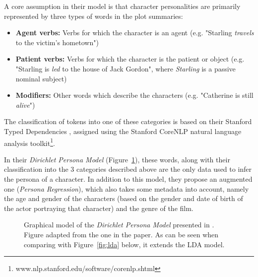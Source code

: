 \documentclass[bsc,frontabs,singlespacing,parskip, twoside]{infthesis}
\begin{document}
A core assumption in their model is that character personalities are primarily represented by three types of words in the plot summaries:
\begin{itemize}
	\item \textbf{Agent verbs:} Verbs for which the character is an agent (e.g. "Starling \textit{travels} to the victim's hometown")
	\item \textbf{Patient verbs:} Verbs for which the character is the patient or object (e.g. "Starling is \textit{led} to the house of Jack Gordon", where \textit{Starling} is a passive nominal subject)
	\item \textbf{Modifiers:} Other words which describe the characters (e.g. "Catherine is still \textit{alive}")
\end{itemize}
The classification of tokens into one of these categories is based on their Stanford Typed Dependencies \cite{de2008stanford}, assigned using the Stanford CoreNLP natural language analysis toolkit\footnote{www.nlp.stanford.edu/software/corenlp.shtml}.

In their \textit{Dirichlet Persona Model} (Figure~\ref{fig:dirichlet_persona}), these words, along with their classification into the 3 categories described above are the only data used to infer the persona of a character. In addition to this model, they propose an augmented one (\textit{Persona Regression}), which also takes some metadata into account, namely the age and gender of the characters (based on the gender and date of birth of the actor portraying that character) and the genre of the film.

\begin{figure}[ht!]
\centering
{}
\caption{Graphical model of the \textit{Dirichlet Persona Model} presented in \cite{Bamman2013}. Figure adapted from the one in the paper. As can be seen when comparing with Figure~\ref{fig:lda} below, it extends the LDA model.}
\label{fig:dirichlet_persona}
\end{figure}
\end{document}
